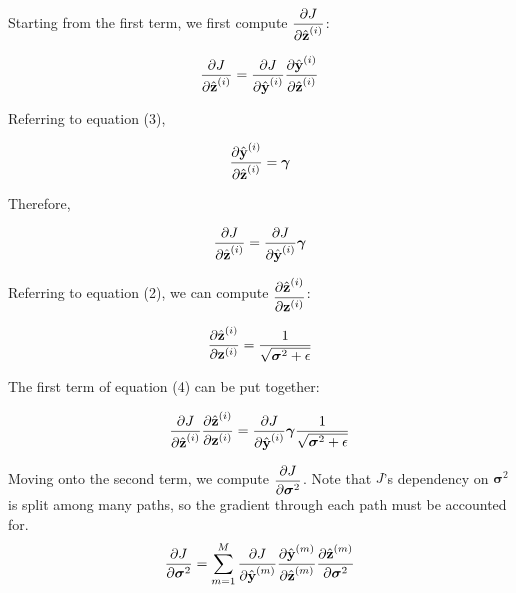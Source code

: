 \documentclass{article}
\begin{document}
\begin{multicols}{2}
Starting from the first term, we first compute $\begin{aligned}
    {\partial J \over \partial \hat{\textbf{z}}^{(i)}}
\end{aligned}$:

\begin{equation}
    {\partial J \over \partial \hat{\textbf{z}}^{(i)}} = 
    {\partial J \over \partial \hat{\textbf{y}}^{(i)}} 
    {\partial \hat{\textbf{y}}^{(i)} \over \partial \hat{\textbf{z}}^{(i)}} \notag
\end{equation}

Referring to equation (3), 

\begin{equation}
    {\partial \hat{\textbf{y}}^{(i)} \over \partial \hat{\textbf{z}}^{(i)}} = \boldsymbol{\gamma} \notag
\end{equation}

Therefore, 

\begin{equation}
    {\partial J \over \partial \hat{\textbf{z}}^{(i)}} = 
    {\partial J \over \partial \hat{\textbf{y}}^{(i)}} \boldsymbol{\gamma} \notag
\end{equation}

Referring to equation (2), we can compute $\begin{aligned}
    {\partial \hat{\textbf{z}}^{(i)} \over \partial \textbf{z}^{(i)}}
\end{aligned}$:

\begin{equation}
    {\partial \hat{\textbf{z}}^{(i)} \over \partial \textbf{z}^{(i)}} = 
    {1 \over \sqrt{\boldsymbol{\sigma}^2 + \epsilon}} \notag
\end{equation}

The first term of equation (4) can be put together:

\begin{equation}
    {\partial J \over \partial \hat{\textbf{z}}^{(i)}}
    {\partial \hat{\textbf{z}}^{(i)} \over \partial \textbf{z}^{(i)}} = {\partial J \over \partial \hat{\textbf{y}}^{(i)}}
    \boldsymbol{\gamma} 
    {1 \over \sqrt{\boldsymbol{\sigma}^2 + \epsilon}} 
\end{equation}

Moving onto the second term, we compute $\begin{aligned}
    {\partial J \over \partial \boldsymbol{\sigma}^2}
\end{aligned}$. Note that $J$'s dependency on $\boldsymbol{\sigma}^2$
is split among many paths, so the gradient through each path must be
accounted for.
\begin{equation}
    {\partial J \over \partial \boldsymbol{\sigma}^2} = 
    \sum_{m = 1}^M {\partial J \over \partial \hat{\textbf{y}}^{(m)}} 
    {\partial \hat{\textbf{y}}^{(m)} \over \partial \hat{\textbf{z}}^{(m)}}
    {\partial \hat{\textbf{z}}^{(m)} \over \partial \boldsymbol{\sigma}^2} \notag
\end{equation}


\end{multicols}
\end{document}
